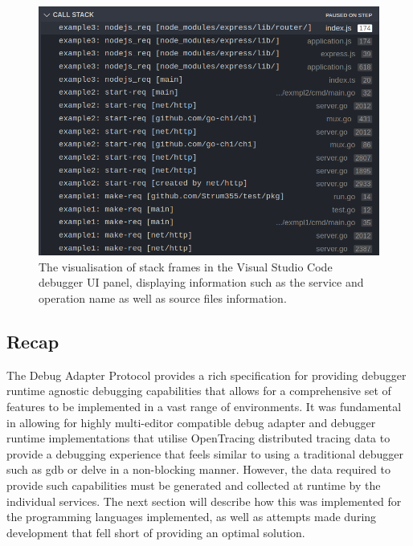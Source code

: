 \documentclass[12pt,pdftex,titlepage]{report}
\begin{document}
            \bigskip
            \begin{figure}[htb!]
                \centering
                \includegraphics[scale=1.6]{vscodestack.png}
                \caption{The visualisation of stack frames in the Visual Studio Code debugger UI panel, displaying information such as the service and operation name as well as source files information.}
                \label{fig:stacks}
            \end{figure}

            \newpage
            \subsection{Recap}
                The Debug Adapter Protocol provides a rich specification for providing debugger runtime agnostic debugging capabilities that allows for a comprehensive set of features to be implemented in a vast range of environments.
                It was fundamental in allowing for highly multi-editor compatible debug adapter and debugger runtime implementations that utilise OpenTracing distributed tracing data to provide a debugging experience that feels similar
                to using a traditional debugger such as gdb or delve in a non-blocking manner. However, the data required to provide such capabilities must be generated and collected at runtime by the individual services. The next section
                will describe how this was implemented for the programming languages implemented, as well as attempts made during development that fell short of providing an optimal solution.

\end{document}
